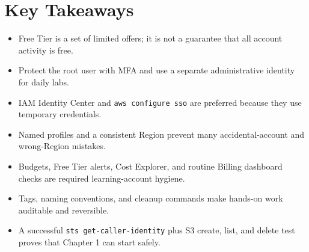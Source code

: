 \section*{Key Takeaways}
\begin{itemize}
    \item Free Tier is a set of limited offers; it is not a guarantee that all account activity is free.
    \item Protect the root user with MFA and use a separate administrative identity for daily labs.
    \item IAM Identity Center and \texttt{aws configure sso} are preferred because they use temporary credentials.
    \item Named profiles and a consistent Region prevent many accidental-account and wrong-Region mistakes.
    \item Budgets, Free Tier alerts, Cost Explorer, and routine Billing dashboard checks are required learning-account hygiene.
    \item Tags, naming conventions, and cleanup commands make hands-on work auditable and reversible.
    \item A successful \texttt{sts get-caller-identity} plus S3 create, list, and delete test proves that Chapter 1 can start safely.
\end{itemize}

